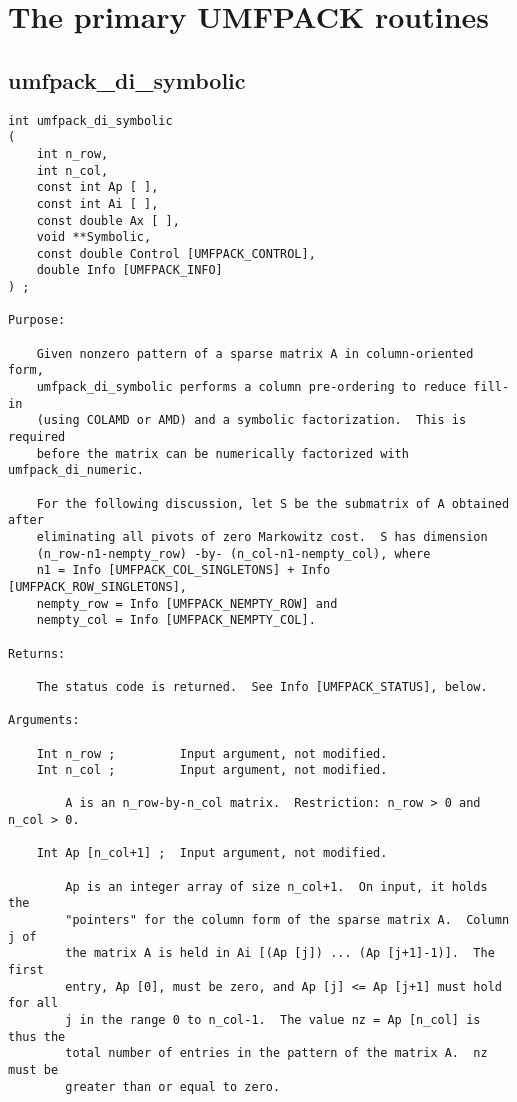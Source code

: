 \documentclass[11pt]{article}
\begin{document}
\newpage
\section{The primary UMFPACK routines}
\label{Primary}

\subsection{umfpack\_di\_symbolic}

{\footnotesize
\begin{verbatim}
int umfpack_di_symbolic
(
    int n_row,
    int n_col,
    const int Ap [ ],
    const int Ai [ ],
    const double Ax [ ],
    void **Symbolic,
    const double Control [UMFPACK_CONTROL],
    double Info [UMFPACK_INFO]
) ;

Purpose:

    Given nonzero pattern of a sparse matrix A in column-oriented form,
    umfpack_di_symbolic performs a column pre-ordering to reduce fill-in
    (using COLAMD or AMD) and a symbolic factorization.  This is required
    before the matrix can be numerically factorized with umfpack_di_numeric.

    For the following discussion, let S be the submatrix of A obtained after
    eliminating all pivots of zero Markowitz cost.  S has dimension
    (n_row-n1-nempty_row) -by- (n_col-n1-nempty_col), where
    n1 = Info [UMFPACK_COL_SINGLETONS] + Info [UMFPACK_ROW_SINGLETONS],
    nempty_row = Info [UMFPACK_NEMPTY_ROW] and
    nempty_col = Info [UMFPACK_NEMPTY_COL].

Returns:

    The status code is returned.  See Info [UMFPACK_STATUS], below.

Arguments:

    Int n_row ;         Input argument, not modified.
    Int n_col ;         Input argument, not modified.

        A is an n_row-by-n_col matrix.  Restriction: n_row > 0 and n_col > 0.

    Int Ap [n_col+1] ;  Input argument, not modified.

        Ap is an integer array of size n_col+1.  On input, it holds the
        "pointers" for the column form of the sparse matrix A.  Column j of
        the matrix A is held in Ai [(Ap [j]) ... (Ap [j+1]-1)].  The first
        entry, Ap [0], must be zero, and Ap [j] <= Ap [j+1] must hold for all
        j in the range 0 to n_col-1.  The value nz = Ap [n_col] is thus the
        total number of entries in the pattern of the matrix A.  nz must be
        greater than or equal to zero.


\end{verbatim}}
\end{document}
